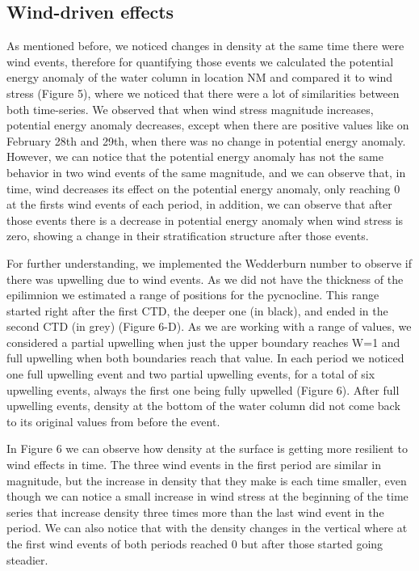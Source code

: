 \documentclass[11pt,letterpaper]{article}
\begin{document}
\subsection{Wind-driven effects}

As mentioned before, we noticed changes in density at the same time there were wind events, therefore for quantifying those events we calculated the potential energy anomaly of the water column in location NM and compared it to wind stress (Figure 5), where we noticed that there were a lot of similarities between both time-series. We observed that when wind stress magnitude increases, potential energy anomaly decreases, except when there are positive values like on February 28th and 29th, when there was no change in potential energy anomaly. However, we can notice that the potential energy anomaly has not the same behavior in two wind events of the same magnitude, and we can observe that, in time, wind decreases its effect on the potential energy anomaly, only reaching 0 at the firsts wind events of each period, in addition, we can observe that after those events there is a decrease in potential energy anomaly when wind stress is zero, showing a change in their stratification structure after those events.


For further understanding, we implemented the Wedderburn number to observe if there was upwelling due to wind events. As we did not have the thickness of the epilimnion we estimated a range of positions for the pycnocline. This range started right after the first CTD, the deeper one (in black), and ended in the second CTD (in grey) (Figure 6-D). As we are working with a range of values, we considered a partial upwelling when just the upper boundary reaches W=1 and full upwelling when both boundaries reach that value. In each period we noticed one full upwelling event and two partial upwelling events, for a total of six upwelling events, always the first one being fully upwelled (Figure 6). After full upwelling events, density at the bottom of the water column did not come back to its original values from before the event. 


In Figure 6 we can observe how density at the surface is getting more resilient to wind effects in time. The three wind events in the first period are similar in magnitude, but the increase in density that they make is each time smaller, even though we can notice a small increase in wind stress at the beginning of the time series that increase density three times more than the last wind event in the period. We can also notice that with the density changes in the vertical where at the first wind events of both periods reached 0 but after those started going steadier.
\end{document}
